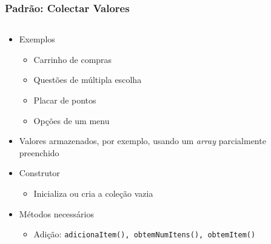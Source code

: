 \documentclass[xcolor={dvipsnames,table},aspectratio=169]{beamer}
\begin{document}
\begin{frame}[fragile]\frametitle{Padrão: Colectar Valores}
\begin{columns}[T]
	\begin{column}{0.5\linewidth}
\begin{itemize}
	\item Exemplos
	\begin{itemize}
		\item Carrinho de compras
		\item Questões de múltipla escolha
		\item Placar de pontos
		\item Opções de um menu
	\end{itemize}
	\item Valores armazenados, por exemplo, usando um \emph{array} parcialmente preenchido
	\item Construtor
	\begin{itemize}
		\item Inicializa ou cria a coleção vazia
	\end{itemize}
	\item Métodos necessários
	\begin{itemize}
		\item Adição: \texttt{adicionaItem(), \texttt{obtemNumItens()}, \texttt{obtemItem()}}
	\end{itemize}
\end{itemize}
	\end{column}
	\begin{column}{0.5\linewidth}
{\tiny\inputminted[bgcolor=cyan!10]{java}{src/carrinho/CarrinhoDeCompras.java}}
	\end{column}
\end{columns}
\end{frame}
\end{document}
